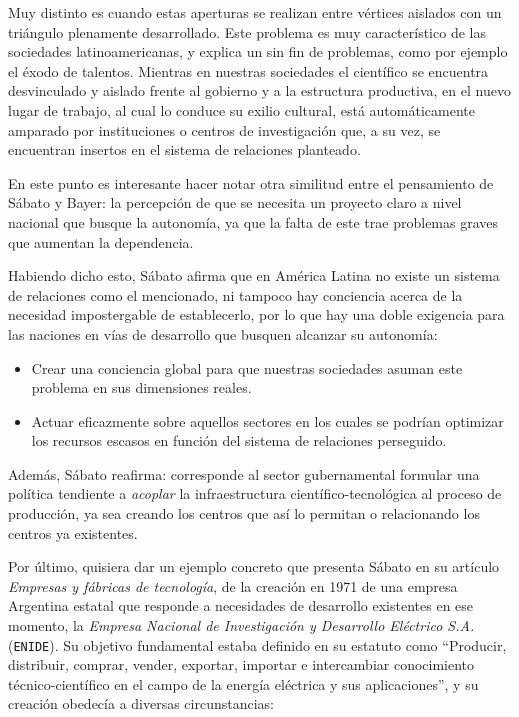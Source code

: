 Muy distinto es cuando estas aperturas se realizan entre vértices aislados con un triángulo plenamente desarrollado. Este problema es muy característico de las sociedades latinoamericanas, y explica un sin fin de problemas, como por ejemplo el éxodo de talentos. Mientras en nuestras sociedades el científico se encuentra desvinculado y aislado frente al gobierno y a la estructura productiva, en el nuevo lugar de trabajo, al cual lo conduce su exilio cultural, está automáticamente amparado por instituciones o centros de investigación que, a su vez, se encuentran insertos en el sistema de relaciones planteado.

En este punto es interesante hacer notar otra similitud entre el pensamiento de Sábato y Bayer: la percepción de que se necesita un proyecto claro a nivel nacional que busque la autonomía, ya que la falta de este trae problemas graves que aumentan la dependencia.

\vspace{0.5em}

Habiendo dicho esto, Sábato afirma que en América Latina no existe un sistema de relaciones como el mencionado, ni tampoco hay conciencia acerca de la necesidad impostergable de establecerlo, por lo que hay una doble exigencia para las naciones en vías de desarrollo que busquen alcanzar su autonomía:
\begin{itemize}
    \item Crear una conciencia global para que nuestras sociedades asuman este problema en sus dimensiones reales.
    \item Actuar eficazmente sobre aquellos sectores en los cuales se podrían optimizar los recursos escasos en función del sistema de relaciones perseguido.
\end{itemize}

Además, Sábato reafirma: corresponde al sector gubernamental formular una política tendiente a \textit{acoplar} la infraestructura científico-tecnológica al proceso de producción, ya sea creando los centros que así lo permitan o relacionando los centros ya existentes.

\vspace{0.5em}

Por último, quisiera dar un ejemplo concreto que presenta Sábato en su artículo \textit{Empresas y fábricas de tecnología}, de la creación en 1971 de una empresa Argentina estatal que responde a necesidades de desarrollo existentes en ese momento, la \textit{Empresa Nacional de Investigación y Desarrollo Eléctrico S.A.} (\texttt{ENIDE}). Su objetivo fundamental estaba definido en su estatuto como ``Producir, distribuir, comprar, vender, exportar, importar e intercambiar conocimiento técnico-científico en el campo de la energía eléctrica y sus aplicaciones'', y su creación obedecía a diversas circunstancias:

